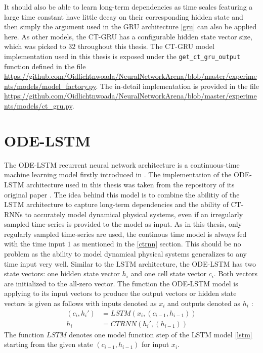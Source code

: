 \documentclass[draft,final]{vutinfth} %
\begin{document}
    It should also be able to learn long-term dependencies as time scales featuring a large time constant have little decay on their corresponding hidden state and then simply the argument used in the GRU architecture \ref{gru} can also be applied here.
    As other models, the CT-GRU has a configurable hidden state vector size, which was picked to $32$ throughout this thesis.
    The CT-GRU model implementation used in this thesis is exposed under the \texttt{get\_ct\_gru\_output} function defined in the file \url{https://github.com/Oidlichtnwoada/NeuralNetworkArena/blob/master/experiments/models/model_factory.py}.
    The in-detail implementation is provided in the file \url{https://github.com/Oidlichtnwoada/NeuralNetworkArena/blob/master/experiments/models/ct_gru.py}.

    \section{ODE-LSTM} \label{odelstm}
    The ODE-LSTM recurrent neural network architecture is a continuous-time machine learning model firstly introduced in \cite{ODELSTM}.
    The implementation of the ODE-LSTM architecture used in this thesis was taken from the repository of its original paper \cite{ODELSTM}.
    The idea behind this model is to combine the abilitiy of the LSTM architecture to capture long-term dependencies and the ability of CT-RNNs to accurately model dynamical physical systems, even if an irregularly sampled time-series is provided to the model as input.
    As in this thesis, only regularly sampled time-series are used, the continous time model is always fed with the time input $1$ as mentioned in the \ref{ctrnn} section. 
    This should be no problem as the ability to model dynamical physical systems generalizes to any time input very well.
    Similar to the LSTM architecture, the ODE-LSTM has two state vectors: one hidden state vector $h_i$ and one cell state vector $c_i$. Both vectors are initialized to the all-zero vector.
    The function the ODE-LSTM model is applying to its input vectors to produce the output vectors or hidden state vectors is given as follows with inputs denoted as $x_i$ and outputs denoted as $h_i$ \cite[p. 5]{ODELSTM}:
    \begin{align}
    (c_i,h_i') &= LSTM(x_i, (c_{i-1}, h_{i-1})) \\
    h_i &= CTRNN(h_i', (h_{i-1}))
    \end{align}
    The function $LSTM$ denotes one model function step of the LSTM model \ref{lstm} starting from the given state $(c_{i-1}, h_{i-1})$ for input $x_i$.
\end{document}
